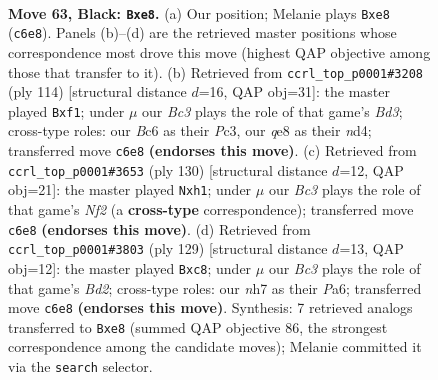 \documentclass[11pt]{article}
\begin{document}
\clearpage

\begin{figure}[p]\centering
\begin{subfigure}{0.46\textwidth}\centering
\resizebox{\linewidth}{!}{%
\newchessgame
\chessboard[
  setfen={4Q3/P5KN/2b5/2k5/8/8/5p2/8 b - - 0 63},
  showmover=false,
  pgfstyle=straightmove, color=movearrow, markmove={c6-e8}
]}
\caption{}
\end{subfigure}\hfill
\begin{subfigure}{0.46\textwidth}\centering
\resizebox{\linewidth}{!}{%
\newchessgame
\chessboard[
  setfen={8/4k3/8/8/3n3P/2PB4/3K4/5q2 w - - 0 58},
  showmover=false,
  pgfstyle=straightmove, color=movearrow, markmove={d3-f1}
]}
\caption{}
\end{subfigure}
\\[4pt]
\begin{subfigure}{0.46\textwidth}\centering
\resizebox{\linewidth}{!}{%
\newchessgame
\chessboard[
  setfen={8/nk6/8/6K1/8/5P2/5N2/7q w - - 0 66},
  showmover=false,
  pgfstyle=straightmove, color=movearrow, markmove={f2-h1}
]}
\caption{}
\end{subfigure}\hfill
\begin{subfigure}{0.46\textwidth}\centering
\resizebox{\linewidth}{!}{%
\newchessgame
\chessboard[
  setfen={2Q5/3bk3/p7/P2P4/8/3K4/8/8 b - - 0 65},
  showmover=false,
  pgfstyle=straightmove, color=movearrow, markmove={d7-c8}
]}
\caption{}
\end{subfigure}
\caption{\textbf{Move 63, Black: \texttt{Bxe8}.} (a) Our position; Melanie plays \texttt{Bxe8} (\texttt{c6e8}). Panels (b)--(d) are the retrieved master positions whose correspondence most drove this move (highest QAP objective among those that transfer to it). (b) Retrieved from \texttt{ccrl\_top\_p0001\#3208} (ply 114) [structural distance $d$=16, QAP obj=31]: the master played \texttt{Bxf1}; under $\mu$ our \emph{Bc3} plays the role of that game's \emph{Bd3}; cross-type roles: our \emph{B}c6 as their \emph{P}c3, our \emph{q}e8 as their \emph{n}d4; transferred move \texttt{c6e8} \textbf{(endorses this move)}. (c) Retrieved from \texttt{ccrl\_top\_p0001\#3653} (ply 130) [structural distance $d$=12, QAP obj=21]: the master played \texttt{Nxh1}; under $\mu$ our \emph{Bc3} plays the role of that game's \emph{Nf2} (a \textbf{cross-type} correspondence); transferred move \texttt{c6e8} \textbf{(endorses this move)}. (d) Retrieved from \texttt{ccrl\_top\_p0001\#3803} (ply 129) [structural distance $d$=13, QAP obj=12]: the master played \texttt{Bxc8}; under $\mu$ our \emph{Bc3} plays the role of that game's \emph{Bd2}; cross-type roles: our \emph{n}h7 as their \emph{P}a6; transferred move \texttt{c6e8} \textbf{(endorses this move)}. Synthesis: 7 retrieved analogs transferred to \texttt{Bxe8} (summed QAP objective 86, the strongest correspondence among the candidate moves); Melanie committed it via the \texttt{search} selector.}
\label{fig:thought-m125}
\end{figure}
\end{document}
